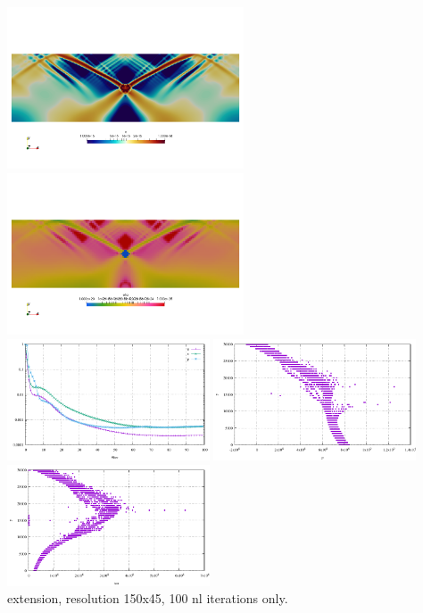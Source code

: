 \begin{center}
\includegraphics[width=7cm]{python_codes/fieldstone_70/compression/e}
\includegraphics[width=7cm]{python_codes/fieldstone_70/compression/etaeff}\\
\includegraphics[width=6cm]{python_codes/fieldstone_70/compression/conv.pdf}
\includegraphics[width=6cm]{python_codes/fieldstone_70/compression/pressure.pdf}\\
\includegraphics[width=6cm]{python_codes/fieldstone_70/compression/tau.pdf}\\
extension, resolution 150x45, 100 nl iterations only.
\end{center}




